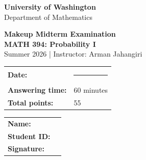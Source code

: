 \documentclass[11pt]{article}
\newcommand{\course}{MATH 394: Probability I}
\newcommand{\instructor}{Arman Jahangiri}
\newcommand{\department}{Department of Mathematics}
\newcommand{\university}{University of Washington}
\begin{document}
\begin{titlepage}
\centering
\vspace*{0.05cm}

{\Large \textbf{\university}}\\
{\large \department}

\vspace{0.28cm}

{\LARGE \color{uwpurple}\textbf{Makeup Midterm Examination}}\\[0.15cm]
{\Large \textbf{\course}}\\[0.15cm]
{\large Summer 2026 \quad | \quad Instructor: \instructor}

\vspace{0.22cm}


\begin{tcolorbox}[
    width=0.94\textwidth,
    colback=softpurple,
    colframe=uwpurple,
    boxrule=0.9pt,
    arc=3mm
]
\centering
\renewcommand{\arraystretch}{1.15}
\begin{tabular}{>{\bfseries}p{}p{}}
Date: & \rule{0.35\textwidth}{0.4pt} \\
Answering time: & 60 minutes \\
Total points: & 55 \\
\end{tabular}
\end{tcolorbox}

\vspace{0.18cm}


\begin{tcolorbox}[
    width=0.94\textwidth,
    colback=white,
    colframe=uwgold,
    boxrule=0.8pt,
    arc=3mm
]
\renewcommand{\arraystretch}{1.35}
\begin{tabular}{>{\bfseries}p{}p{}}
Name: & \hrulefill \\
Student ID: & \hrulefill \\
Signature: & \hrulefill \\
\end{tabular}
\end{tcolorbox}

\vspace{0.15cm}


\end{titlepage}
\end{document}
